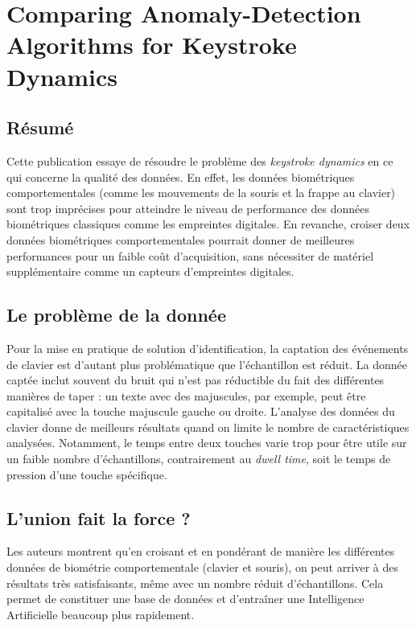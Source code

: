 \section{Comparing Anomaly-Detection Algorithms for Keystroke Dynamics\cite{panasiuk2016}}


\subsection{Résumé}
Cette publication essaye de résoudre le problème des \textit{keystroke dynamics} en ce qui concerne la qualité des données. En effet, les données biométriques comportementales (comme les mouvements de la souris et la frappe au clavier) sont trop imprécises pour atteindre le niveau de performance des données biométriques classiques comme les empreintes digitales. En revanche, croiser deux données biométriques comportementales pourrait donner de meilleures performances pour un faible coût d'acquisition, sans nécessiter de matériel supplémentaire comme un capteurs d'empreintes digitales.

\subsection{Le problème de la donnée}
Pour la mise en pratique de solution d'identification, la captation des événements de clavier est d'autant plus problématique que l'échantillon est réduit. La donnée captée inclut souvent du bruit qui n'est pas réductible du fait des différentes manières de taper : un texte avec des majuscules, par exemple, peut être capitalisé avec la touche majuscule gauche ou droite. L'analyse des données du clavier donne de meilleurs résultats quand on limite le nombre de caractéristiques analysées. Notamment, le temps entre deux touches varie trop pour être utile sur un faible nombre d'échantillons, contrairement au \textit{dwell time}, soit le temps de pression d'une touche spécifique.

\subsection{L'union fait la force ?}
Les auteurs montrent qu'en croisant et en pondérant de manière  les différentes données de biométrie comportementale (clavier et souris), on peut arriver à des  résultats très satisfaisants, même avec un nombre réduit d'échantillons. Cela permet de constituer une base de données et d'entraîner une Intelligence Artificielle beaucoup plus rapidement. 

